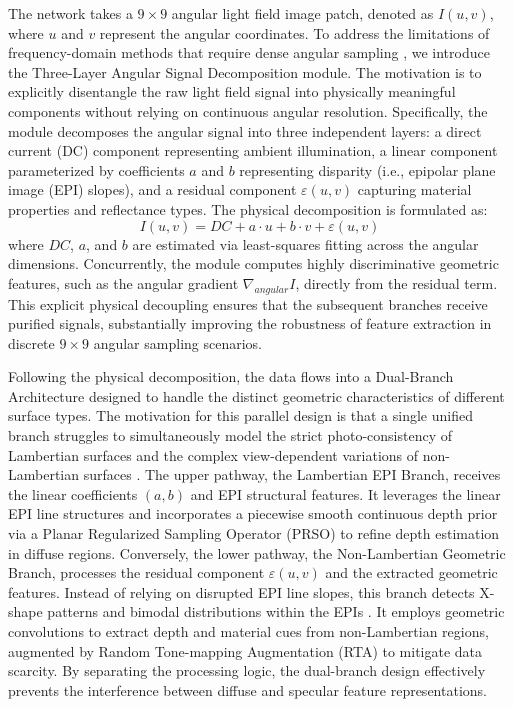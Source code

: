 \documentclass[lettersize,journal]{IEEEtran}
\begin{document}
The network takes a $9 \times 9$ angular light field image patch, denoted as $I(u,v)$, where $u$ and $v$ represent the angular coordinates. To address the limitations of frequency-domain methods that require dense angular sampling \cite{vaswani2017}, we introduce the Three-Layer Angular Signal Decomposition module. The motivation is to explicitly disentangle the raw light field signal into physically meaningful components without relying on continuous angular resolution. Specifically, the module decomposes the angular signal into three independent layers: a direct current (DC) component representing ambient illumination, a linear component parameterized by coefficients $a$ and $b$ representing disparity (i.e., epipolar plane image (EPI) slopes), and a residual component $\varepsilon(u,v)$ capturing material properties and reflectance types. The physical decomposition is formulated as:
\begin{equation}
I(u,v) = DC + a \cdot u + b \cdot v + \varepsilon(u,v)
\end{equation}
where $DC$, $a$, and $b$ are estimated via least-squares fitting across the angular dimensions. Concurrently, the module computes highly discriminative geometric features, such as the angular gradient $\nabla_{angular} I$, directly from the residual term. This explicit physical decoupling ensures that the subsequent branches receive purified signals, substantially improving the robustness of feature extraction in discrete $9 \times 9$ angular sampling scenarios.

Following the physical decomposition, the data flows into a Dual-Branch Architecture designed to handle the distinct geometric characteristics of different surface types. The motivation for this parallel design is that a single unified branch struggles to simultaneously model the strict photo-consistency of Lambertian surfaces and the complex view-dependent variations of non-Lambertian surfaces \cite{vaswani2017}. The upper pathway, the Lambertian EPI Branch, receives the linear coefficients $(a,b)$ and EPI structural features. It leverages the linear EPI line structures and incorporates a piecewise smooth continuous depth prior via a Planar Regularized Sampling Operator (PRSO) to refine depth estimation in diffuse regions. Conversely, the lower pathway, the Non-Lambertian Geometric Branch, processes the residual component $\varepsilon(u,v)$ and the extracted geometric features. Instead of relying on disrupted EPI line slopes, this branch detects X-shape patterns and bimodal distributions within the EPIs \cite{vaswani2017}. It employs geometric convolutions to extract depth and material cues from non-Lambertian regions, augmented by Random Tone-mapping Augmentation (RTA) to mitigate data scarcity. By separating the processing logic, the dual-branch design effectively prevents the interference between diffuse and specular feature representations.
\end{document}
